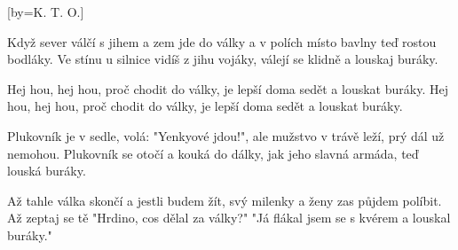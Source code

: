 [by={K. T. O.}]

\beginverse{}
Když sever válčí s jihem a zem jde do války
a v polích místo bavlny teď rostou bodláky.
Ve stínu u silnice vidíš z jihu vojáky,
válejí se klidně a louskaj buráky.
\endverse{}

\beginchorus{}
Hej hou, hej hou, proč chodit do války,
je lepší doma sedět a louskat buráky.
Hej hou, hej hou, proč chodit do války,
je lepší doma sedět a louskat buráky.
\endchorus{}

\beginverse{}
Plukovník je v sedle, volá: "Yenkyové jdou!",
ale mužstvo v trávě leží, prý dál už nemohou.
Plukovník se otočí a kouká do dálky,
jak jeho slavná armáda, teď louská buráky.
\endverse{}

\beginchorus{}

\endchorus{}

\beginverse{}
Až tahle válka skončí a jestli budem žít,
svý milenky a ženy zas půjdem políbit.
Až zeptaj se tě "Hrdino, cos dělal za války?"
"Já flákal jsem se s kvérem a louskal buráky."
\endverse{}

\beginchorus{}

\endchorus{}

\endsong{}
